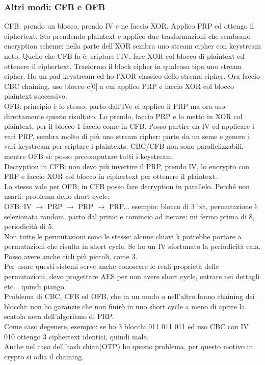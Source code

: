 \documentclass[16px]{article}
\begin{document}
\subsubsection{Altri modi: CFB e OFB}
CFB: prendo un blocco, prendo IV e ne faccio XOR. Applico PRP ed ottengo il ciphertext. Sto prendendo plaintext e applico due trasformazioni che sembrano encryption scheme: nella parte dell'XOR sembra uno stream cipher con keystream noto. Quello che CFB fa è: criptare l'IV, fare XOR col blocco di plaintext ed ottenere il ciphertext. Trasformo il block cipher in qualcosa tipo uno stream cipher. Ho un pad keystream ed ho l'XOR classico dello strema cipher. Ora faccio CBC chaining, uso blocco c[0] a cui applico PRP e faccio XOR col blocco plaintext successivo.\\ OFB: principio è lo stesso, parto dall'IVe ci applico il PRP ma ora uso direttamente questo risultato. Lo prendo, faccio PRP e lo metto in XOR col plaintext, per il blocco 1 faccio come in CFB. Posso partire da IV ed applicare i vari PRP, sembra molto di più uno stream cipher: parto da un seme e genero i vari keystream per criptare i plaintexts. CBC/CFB non sono parallelizzabili, mentre OFB sì: posso precomputare tutti i keystream.\\ Decryption in CFB: non devo più invertire il PRP, prendo IV, lo encrypto con PRP e faccio XOR col blocco in ciphertext per ottenere il plaintext.\\ Lo stesso vale per OFB; in CFB posso fare decryption in parallelo. Perché non usarli: problema dello short cycle:\\ OFB: IV $\rightarrow$ PRP $\rightarrow$ PRP $\rightarrow$ PRP... esempio: blocco di 3 bit, permutazione è selezionata random, parto dal primo e comincio ad iterare: mi fermo prima di 8, periodicità di 5.\\ Non tutte le permutazioni sono le stesse: alcune chiavi k potrebbe portare a permutazioni che risulta in short cycle. Se ho un IV sfortunato la periodicità cala. Posso avere anche cicli più piccoli, come 3.\\ Per usare questi sistemi serve anche conoscere le reali proprietà delle permutazioni, devo progettare AES per non avere short cycle, entrare nei dettagli etc... quindi piango.\\ Problema di CBC, CFB ed OFB, che in un modo o nell'altro fanno chaining dei blocchi: non ho garanzie che non finirò in uno short cycle a meno di aprire la scatola nera dell'algoritmo di PRP.\\ Come caso degenere, esempio: se ho 3 blocchi 011 011 011 ed uso CBC con IV 010 ottengo 3 ciphertext identici, quindi male.\\ Anche nel caso dell'hash chian(OTP) ho questo problema, per questo motivo in crypto si odia il chaining.
\end{document}
